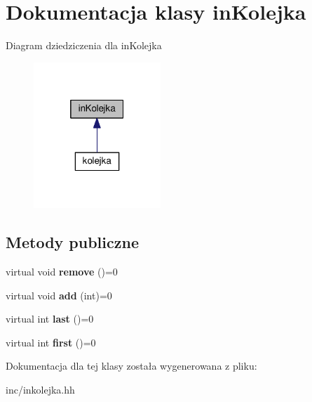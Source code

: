\section{Dokumentacja klasy in\+Kolejka}
\label{classin_kolejka}


Diagram dziedziczenia dla in\+Kolejka
\nopagebreak
\begin{figure}[H]
\begin{center}
\leavevmode
\includegraphics[width=136pt]{classin_kolejka__inherit__graph}
\end{center}
\end{figure}
\subsection*{Metody publiczne}
\begin{DoxyCompactItemize}
\item 
virtual void {\bfseries remove} ()=0\label{classin_kolejka_ac5cab7b3ed5f6d2ecdd0b56b49052c3d}

\item 
virtual void {\bfseries add} (int)=0\label{classin_kolejka_a44867628b735e9896251879866424132}

\item 
virtual int {\bfseries last} ()=0\label{classin_kolejka_a378039173f692c438912890d247036ee}

\item 
virtual int {\bfseries first} ()=0\label{classin_kolejka_aee5f6ffb249dc8284fb659d73f5f2ed6}

\end{DoxyCompactItemize}


Dokumentacja dla tej klasy została wygenerowana z pliku\+:\begin{DoxyCompactItemize}
\item 
inc/inkolejka.\+hh\end{DoxyCompactItemize}
